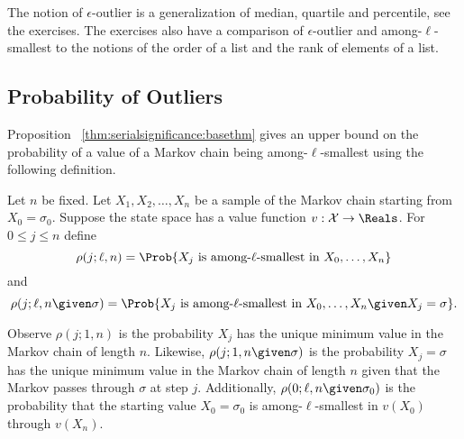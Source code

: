 \documentclass[12pt]{article}
\begin{document}
\begin{example}
    The notion of \( \epsilon \)-outlier is a generalization of median,
    quartile and percentile, see the exercises.  The exercises also have
    a comparison of \( \epsilon \)-outlier and among-\( \ell \)-smallest
    to the notions of the order of a list and the rank of elements of a
    list.
\end{example}

\subsection*{Probability of Outliers}

Proposition~%
\ref{thm:serialsignificance:basethm} gives an upper bound on the
probability of a value of a Markov chain being among-\( \ell \)-smallest
using the following definition.
\begin{definition}
    Let \( n \) be fixed.  Let \( X_1, X_2, \dots, X_n \) be a sample of
    the Markov chain starting from \( X_0 = \sigma_0 \). Suppose the
    state space has a value function \( v : \mathcal {X} \to \Reals \).
    For \( 0 \le j \le n \) define
    \[
        \rho(j; \ell, n) = \Prob{X_j \text{ is among-\( \ell \)-smallest
        in } X_0, \dots, X_n }
    \] and
    \[
        \rho(j; \ell, n \given \sigma) = \Prob{X_j \text{ is among-\(
        \ell \)-smallest in } X_0, \dots, X_n%
        \given X_j = \sigma }.
    \]
\end{definition}

Observe \( \rho(j; 1 ,n) \) is the probability \( X_j \) has the unique
minimum value in the Markov chain of length \( n \).  Likewise, \( \rho(j;
1, n \given \sigma) \) is the probability \( X_j = \sigma \) has the
unique minimum value in the Markov chain of length \( n \) given that
the Markov passes through \( \sigma \) at step \( j \).  Additionally, \(
\rho(0; \ell, n\given \sigma_0) \) is the probability that the starting
value \( X_0 = \sigma_0 \) is among-\( \ell \)-smallest in \( v(X_0) \)
through \( v(X_n) \).
\end{document}
